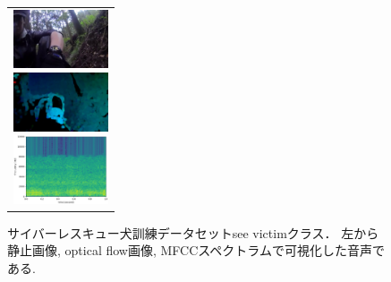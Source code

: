 \documentclass[twocolumn, a4paper]{UECIEresume}
\begin{document}
\begin{figure}[htbp]
    \begin{tabular}{l}

      \begin{minipage}{0.32\hsize}
        \begin{center}
          \includegraphics[clip, width=2.8cm]{./Figures/still_seevictim3.eps}
        \end{center}
      \end{minipage}

      \begin{minipage}{0.32\hsize}
        \begin{center}
          \includegraphics[clip, width=2.8cm]{./Figures/optic_seevictim3.eps}
        \end{center}
      \end{minipage}

      \begin{minipage}{0.32\hsize}
        \begin{center}
          \includegraphics[clip, width=2.8cm]{./Figures/sound_seevictim.eps}
        \end{center}
      \end{minipage}
    \end{tabular}

    \caption{サイバーレスキュー犬訓練データセットsee victimクラス． 左から静止画像, optical flow画像, MFCCスペクトラムで可視化した音声である.}
    \label{dataset}
\end{figure}
\end{document}
